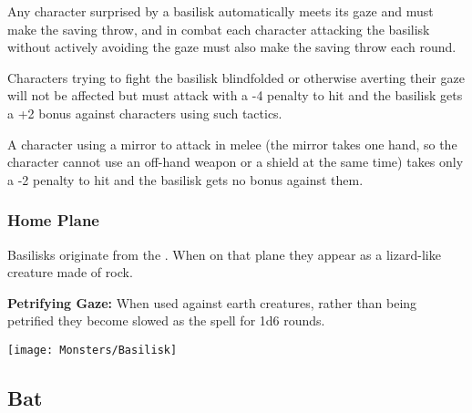 \begin{multicols*}{2}
Any character surprised by a basilisk automatically meets its gaze and must make the saving throw, and in combat each character attacking the basilisk without actively avoiding the gaze must also make the saving throw each round.

Characters trying to fight the basilisk blindfolded or otherwise averting their gaze will not be affected but must attack with a -4 penalty to hit and the basilisk gets a +2 bonus against characters using such tactics.

A character using a mirror to attack in melee (the mirror takes one hand, so the character cannot use an off-hand weapon or a shield at the same time) takes only a -2 penalty to hit and the basilisk gets no bonus against them.

\subsubsection{Home Plane}
Basilisks originate from the . When on that plane they appear as a lizard-like creature made of rock.

\textbf{Petrifying Gaze:} When used against earth creatures, rather than being petrified they become slowed as the spell  for 1d6 rounds.

\texttt{[image: Monsters/Basilisk]}

\subsection{Bat}
\end{multicols*}
